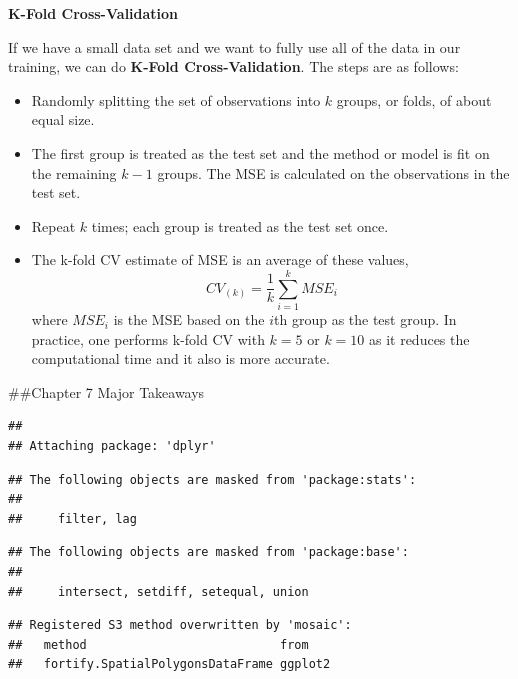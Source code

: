 \documentclass[
]{book}
\newenvironment{Shaded}{\begin{snugshade}}{\end{snugshade}}
\newcommand{\AttributeTok}[1]{\textcolor[rgb]{0.13,0.29,0.53}{#1}}
\newcommand{\CommentTok}[1]{\textcolor[rgb]{0.56,0.35,0.01}{\textit{#1}}}
\newcommand{\DecValTok}[1]{\textcolor[rgb]{0.00,0.00,0.81}{#1}}
\newcommand{\FunctionTok}[1]{\textcolor[rgb]{0.13,0.29,0.53}{\textbf{#1}}}
\newcommand{\NormalTok}[1]{#1}
\newcommand{\OtherTok}[1]{\textcolor[rgb]{0.56,0.35,0.01}{#1}}
\newcommand{\SpecialCharTok}[1]{\textcolor[rgb]{0.81,0.36,0.00}{\textbf{#1}}}
\begin{document}
\textbf{K-Fold Cross-Validation}

If we have a small data set and we want to fully use all of the data in our training, we can do \textbf{K-Fold Cross-Validation}. The steps are as follows:

\begin{itemize}
\item
  Randomly splitting the set of observations into \(k\) groups, or folds, of about equal size.
\item
  The first group is treated as the test set and the method or model is fit on the remaining \(k-1\) groups. The MSE is calculated on the observations in the test set.
\item
  Repeat \(k\) times; each group is treated as the test set once.
\item
  The k-fold CV estimate of MSE is an average of these values,
  \[CV_{(k)} = \frac{1}{k}\sum^k_{i=1}MSE_i \]
  where \(MSE_i\) is the MSE based on the \(i\)th group as the test group. In practice, one performs k-fold CV with \(k=5\) or \(k=10\) as it reduces the computational time and it also is more accurate.
\end{itemize}

\begin{Shaded}
\end{Shaded}

\#\#Chapter 7 Major Takeaways

\begin{verbatim}
## 
## Attaching package: 'dplyr'
\end{verbatim}

\begin{verbatim}
## The following objects are masked from 'package:stats':
## 
##     filter, lag
\end{verbatim}

\begin{verbatim}
## The following objects are masked from 'package:base':
## 
##     intersect, setdiff, setequal, union
\end{verbatim}

\begin{verbatim}
## Registered S3 method overwritten by 'mosaic':
##   method                           from   
##   fortify.SpatialPolygonsDataFrame ggplot2
\end{verbatim}
\end{document}
